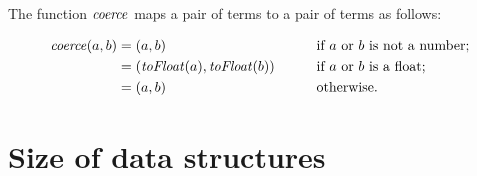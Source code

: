 The function ${\it coerce}$ maps a pair of terms to a pair of terms as follows:
\iftrue
\begin{alignat*}{2}
\mathit{coerce}(a,b) &= (a,b) && \qquad\text{if $a$ or $b$ is not a number;} \\
                     &= ({\it toFloat}(a),{\it toFloat}(b)) && \qquad\text{if $a$ or $b$ is a float;} \\
                     &= (a,b) && \qquad\text{otherwise.}
\end{alignat*}
\else
\[\I{coerce}(a,b)=\begin{cases}
(a,b) & \text{if $a$ or $b$ is not a number;} \\
(\I{toFloat}(a),\I{toFloat}(b)) & \text{if $a$ or $b$ is a float;} \\
(a,b) & \text{otherwise.}
\end{cases}\]
\fi
{}

\section{Size of data structures}

